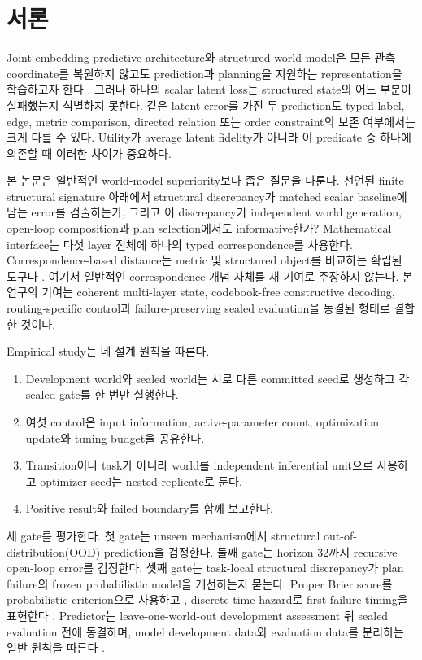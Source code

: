 \section{서론}
\label{sec:introduction}

Joint-embedding predictive architecture와 structured world model은 모든
관측 coordinate를 복원하지 않고도 prediction과 planning을 지원하는
representation을 학습하고자 한다
\citep{assran2023ijepa,assran2024vjepa,kipf2020contrastive}. 그러나 하나의
scalar latent loss는 structured state의 어느 부분이 실패했는지 식별하지
못한다. 같은 latent error를 가진 두 prediction도 typed label, edge, metric
comparison, directed relation 또는 order constraint의 보존 여부에서는 크게
다를 수 있다. Utility가 average latent fidelity가 아니라 이 predicate 중
하나에 의존할 때 이러한 차이가 중요하다.

본 논문은 일반적인 world-model superiority보다 좁은 질문을 다룬다. 선언된
finite structural signature 아래에서 structural discrepancy가 matched scalar
baseline에 남는 error를 검출하는가, 그리고 이 discrepancy가 independent
world generation, open-loop composition과 plan selection에서도 informative한가?
Mathematical interface는 다섯 layer 전체에 하나의 typed correspondence를
사용한다. Correspondence-based distance는 metric 및 structured object를
비교하는 확립된 도구다 \citep{memoli2011gromov,vayer2020fused}. 여기서 일반적인
correspondence 개념 자체를 새 기여로 주장하지 않는다. 본 연구의 기여는
coherent multi-layer state, codebook-free constructive decoding,
routing-specific control과 failure-preserving sealed evaluation을 동결된
형태로 결합한 것이다.

Empirical study는 네 설계 원칙을 따른다.
\begin{enumerate}[label=(\roman*)]
    \item Development world와 sealed world는 서로 다른 committed seed로
    생성하고 각 sealed gate를 한 번만 실행한다.
    \item 여섯 control은 input information, active-parameter count,
    optimization update와 tuning budget을 공유한다.
    \item Transition이나 task가 아니라 world를 independent inferential
    unit으로 사용하고 optimizer seed는 nested replicate로 둔다.
    \item Positive result와 failed boundary를 함께 보고한다.
\end{enumerate}

세 gate를 평가한다. 첫 gate는 unseen mechanism에서 structural
out-of-distribution(OOD) prediction을 검정한다. 둘째 gate는 horizon 32까지
recursive open-loop error를 검정한다. 셋째 gate는 task-local structural
discrepancy가 plan failure의 frozen probabilistic model을 개선하는지 묻는다.
Proper Brier score를 probabilistic criterion으로 사용하고
\citep{gneiting2007proper}, discrete-time hazard로 first-failure timing을
표현한다 \citep{singer1993time}. Predictor는 leave-one-world-out development
assessment 뒤 sealed evaluation 전에 동결하며, model development data와
evaluation data를 분리하는 일반 원칙을 따른다
\citep{varma2006bias,collins2024tripod}.

